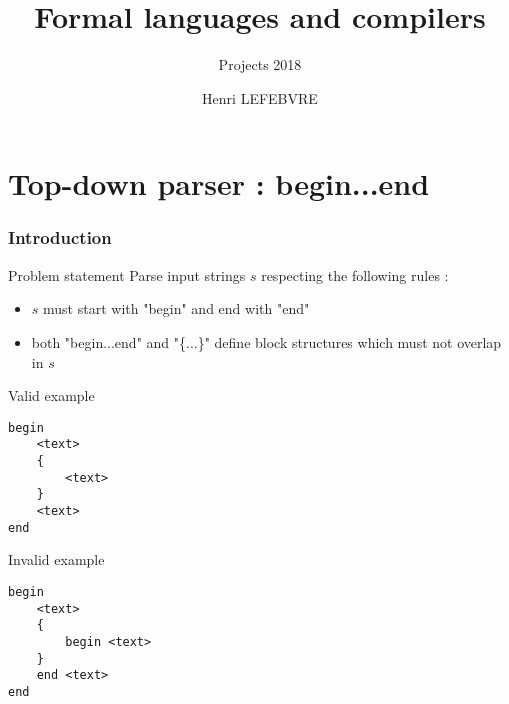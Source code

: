 \documentclass{beamer}
\begin{document}
\title{Formal languages and compilers}
\subtitle{Projects 2018}
\author{Henri LEFEBVRE}

\maketitle

\begin{frame}\tableofcontents\end{frame}

\section{Top-down parser : begin...end}
\begin{frame}[fragile]
    \frametitle{Introduction}

    \begin{block}{Problem statement}
        Parse input strings $s$ respecting the following rules :
        \begin{itemize}
            \item $s$ must start with "begin" and end with "end"
            \item both "begin...end" and "\{...\}" define block structures which must not overlap in $s$
        \end{itemize}
    \end{block}

    \begin{minipage}{.45\textwidth}
        \begin{exampleblock}{Valid example}
            \begin{lstlisting}
begin
    <text>
    {
        <text>
    }
    <text>
end
            \end{lstlisting}
        \end{exampleblock}
    \end{minipage}
    \hspace{.2cm}
    \begin{minipage}{.45\textwidth}
        \begin{alertblock}{Invalid example}
            \begin{lstlisting}
begin
    <text>
    {
        begin <text>
    }
    end <text>
end
            \end{lstlisting}
        \end{alertblock}
    \end{minipage}

\end{frame}
\end{document}
